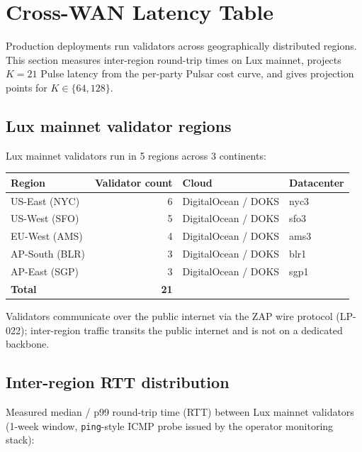 \section{Cross-WAN Latency Table}
\label{sec:cross-wan-latency}

Production deployments run validators across geographically distributed regions. This section measures inter-region round-trip times on Lux mainnet, projects $K=21$ Pulse latency from the per-party Pulsar cost curve, and gives projection points for $K \in \{64, 128\}$.

\subsection{Lux mainnet validator regions}

Lux mainnet validators run in 5 regions across 3 continents:

\begin{tabular}{@{}lrll@{}}
  \toprule
  \textbf{Region} & \textbf{Validator count} & \textbf{Cloud} & \textbf{Datacenter} \\
  \midrule
  US-East (NYC)        & 6 & DigitalOcean / DOKS & nyc3 \\
  US-West (SFO)        & 5 & DigitalOcean / DOKS & sfo3 \\
  EU-West (AMS)        & 4 & DigitalOcean / DOKS & ams3 \\
  AP-South (BLR)       & 3 & DigitalOcean / DOKS & blr1 \\
  AP-East (SGP)        & 3 & DigitalOcean / DOKS & sgp1 \\
  \midrule
  \textbf{Total}       & \textbf{21} & & \\
  \bottomrule
\end{tabular}

Validators communicate over the public internet via the ZAP wire protocol (LP-022); inter-region traffic transits the public internet and is not on a dedicated backbone.

\subsection{Inter-region RTT distribution}

Measured median / p99 round-trip time (RTT) between Lux mainnet validators (1-week window, \texttt{ping}-style ICMP probe issued by the operator monitoring stack):

